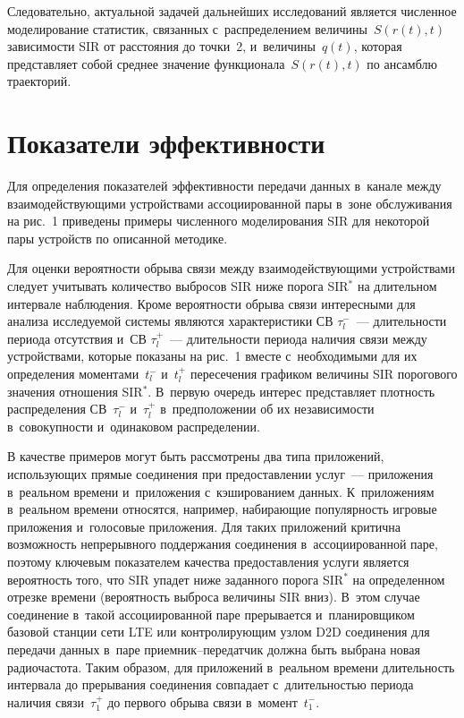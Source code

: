 \begin{multicols}{2}
Следовательно, актуальной задачей дальнейших исследований является 
численное моделирование статистик, связанных с~распределением 
величины~$S(r(t),t)$ зависимости SIR от 
расстояния до точки~2, и~величины~$q(t)$, которая представляет собой среднее 
значение функционала~$S(r(t),t)$ по ан\-самблю траекторий. 
  
\section{Показатели эффективности}

\vspace*{2pt}

  Для определения показателей эффективности передачи данных в~канале 
между взаимодей\-ст\-ву\-ющи\-ми устройствами ассоциированной пары в~зоне 
обслуживания на рис.~1 приведены примеры чис\-лен\-но\-го моделирования SIR 
для некоторой пары устройств по описанной методике. 
  

 
  Для оценки вероятности обрыва связи между взаимодействующими 
устройствами следует учитывать количество выбросов SIR ниже порога SIR$^*$ 
на длительном интервале наблюдения. Кроме вероятности обрыва связи 
интересными для анализа исследуемой системы являются характеристики СВ 
$\tau^-_l$~--- длительности периода отсутствия и~СВ $\tau_l^+$~--- 
длительности периода наличия связи между устройствами, которые показаны 
на рис.~1 вместе с~необходимыми для их определения моментами~$t_l^-$ 
и~$t_l^+$ пересечения графиком величины SIR порогового значения отношения 
SIR$^*$. В~первую очередь интерес представляет плотность распределения  
СВ~$\tau_l^-$ и~$\tau_l^+$ в~предположении об их независимости 
в~совокупности и~одинаковом распределении. 
  
  В качестве примеров могут быть рассмотрены два типа приложений, 
использующих прямые соединения при предостав\-ле\-нии услуг~--- приложения 
в~реальном времени и~приложения с~кэшированием данных. К~приложениям 
в~реальном времени относятся, например, набирающие популярность игровые 
приложения и~голосовые приложения. Для таких приложений критична 
возможность непрерывного поддержания соединения в~ассоциированной паре, 
поэтому ключевым показателем качества предостав\-ле\-ния услуги является 
вероятность того, что SIR упадет ниже заданного порога SIR$^*$ на 
определенном отрезке времени (вероятность выброса величины SIR вниз). 
В~этом случае соединение в~такой ассоциированной паре прерывается 
и~планировщиком базовой станции сети LTE или контролирующим узлом D2D 
соединения для передачи данных в~паре при\-ем\-ник--пе\-ре\-дат\-чик должна 
быть выбрана новая радиочастота. Таким образом, для приложений в~реальном 
времени длительность интервала до прерывания соединения совпадает 
с~длительностью периода наличия связи~$\tau_1^+$ до первого обрыва связи 
в~момент~$t_1^-$. 


\end{multicols}
